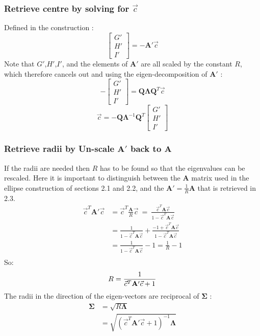 \documentclass{article}
\def\mat#1{\mathbf{#1}}
\begin{document}
\subsubsection{Retrieve centre by solving for $\vec{c}$}
Defined in the construction :
\begin{equation}
\left[\begin{smallmatrix} G'\\H'\\I' \end{smallmatrix}\right] = -\mat{A'}\vec{c}
\end{equation}
Note that $G'$,$H'$,$I'$, and the elements of $\mat{A'}$ are all scaled by the constant $R$, which therefore cancels out and using the eigen-decomposition of $\mat{A'}$ :
\begin{equation}
-\left[\begin{smallmatrix} G'\\H'\\I' \end{smallmatrix}\right] = \mat{Q}\mat{\Lambda}\mat{Q}^{T}\vec{c}
\end{equation}
\begin{equation}
\vec{c} = -\mat{Q}\mat{\Lambda}^{-1}\mat{Q}^{T}\left[\begin{smallmatrix} G'\\H'\\I' \end{smallmatrix}\right] 
\end{equation}
\subsubsection{Retrieve radii by Un-scale $\mat{A'}$ back to $\mat{A}$}
If the radii are needed then $R$ has to be found so that the
eigenvalues can be rescaled. Here it is important to distinguish
between the $\mat{A}$ matrix used in the ellipse construction of
sections 2.1 and 2.2, and the $\mat{A'}=\frac{1}{R}\mat{A}$ that is retrieved in 2.3.
\begin{equation}
\begin{split}
\vec{c}^T \mat{A'} \vec{c} &= \vec{c}^T \frac{\mat{A}}{R} \vec{c} ~=~\frac{\vec{c}^T\mat{A}\vec{c}}{1 - \vec{c}^T\mat{A}\vec{c} } \\
&= \frac{1}{1 - \vec{c}^T\mat{A}\vec{c}} + \frac{-1 + \vec{c}^T\mat{A}\vec{c}}{1-\vec{c}^T\mat{A}\vec{c}}\\
&= \frac{1}{1 - \vec{c}^T\mat{A}\vec{c}} -1 = \frac{1}{R} -1\\
\end{split}
\end{equation}
So:
\begin{equation}
R = \frac{1}{\vec{c}^T\mat{A'}\vec{c} +1}\\
\end{equation}
The radii in the direction of the eigen-vectors are reciprocal of $\mat{\Sigma}$ :
\begin{equation}
\begin{split}
\mat{\Sigma} &= \sqrt{R \mat{\Lambda}}\\
&= \sqrt{ (\vec{c}^T\mat{A'}\vec{c} +1)^{-1} \mat{\Lambda}}
\end{split}
\end{equation}
\end{document}
